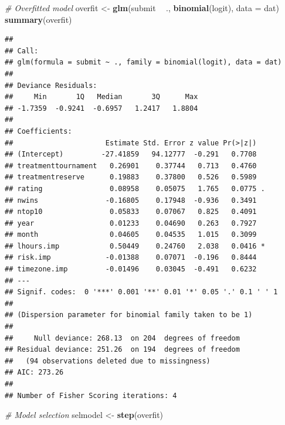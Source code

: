 \documentclass[]{article}
\newenvironment{Shaded}{\begin{snugshade}}{\end{snugshade}}
\newcommand{\KeywordTok}[1]{\textcolor[rgb]{0.13,0.29,0.53}{\textbf{#1}}}
\newcommand{\DataTypeTok}[1]{\textcolor[rgb]{0.13,0.29,0.53}{#1}}
\newcommand{\StringTok}[1]{\textcolor[rgb]{0.31,0.60,0.02}{#1}}
\newcommand{\CommentTok}[1]{\textcolor[rgb]{0.56,0.35,0.01}{\textit{#1}}}
\newcommand{\OperatorTok}[1]{\textcolor[rgb]{0.81,0.36,0.00}{\textbf{#1}}}
\newcommand{\NormalTok}[1]{#1}
\let\oldShaded\Shaded
\let\endoldShaded\endShaded
\renewenvironment{Shaded}{\footnotesize\oldShaded}{\endoldShaded}
\begin{document}
\begin{Shaded}
\begin{Highlighting}[]
\CommentTok{# Overfitted model}
\NormalTok{overfit <-}\StringTok{ }\KeywordTok{glm}\NormalTok{(submit }\OperatorTok{~}\StringTok{ }\NormalTok{., }\KeywordTok{binomial}\NormalTok{(logit), }\DataTypeTok{data =}\NormalTok{ dat)}
\KeywordTok{summary}\NormalTok{(overfit)}
\end{Highlighting}
\end{Shaded}

\begin{verbatim}
## 
## Call:
## glm(formula = submit ~ ., family = binomial(logit), data = dat)
## 
## Deviance Residuals: 
##     Min       1Q   Median       3Q      Max  
## -1.7359  -0.9241  -0.6957   1.2417   1.8804  
## 
## Coefficients:
##                      Estimate Std. Error z value Pr(>|z|)  
## (Intercept)         -27.41859   94.12777  -0.291   0.7708  
## treatmenttournament   0.26901    0.37744   0.713   0.4760  
## treatmentreserve      0.19883    0.37800   0.526   0.5989  
## rating                0.08958    0.05075   1.765   0.0775 .
## nwins                -0.16805    0.17948  -0.936   0.3491  
## ntop10                0.05833    0.07067   0.825   0.4091  
## year                  0.01233    0.04690   0.263   0.7927  
## month                 0.04605    0.04535   1.015   0.3099  
## lhours.imp            0.50449    0.24760   2.038   0.0416 *
## risk.imp             -0.01388    0.07071  -0.196   0.8444  
## timezone.imp         -0.01496    0.03045  -0.491   0.6232  
## ---
## Signif. codes:  0 '***' 0.001 '**' 0.01 '*' 0.05 '.' 0.1 ' ' 1
## 
## (Dispersion parameter for binomial family taken to be 1)
## 
##     Null deviance: 268.13  on 204  degrees of freedom
## Residual deviance: 251.26  on 194  degrees of freedom
##   (94 observations deleted due to missingness)
## AIC: 273.26
## 
## Number of Fisher Scoring iterations: 4
\end{verbatim}

\begin{Shaded}
\begin{Highlighting}[]
\CommentTok{# Model selection}
\NormalTok{selmodel <-}\StringTok{ }\KeywordTok{step}\NormalTok{(overfit)}
\end{Highlighting}
\end{Shaded}
\end{document}
